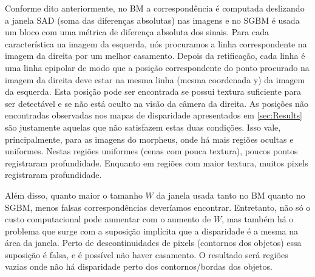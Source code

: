 \documentclass{bmvc2k}
\begin{document}
Conforme dito anteriormente, no BM a correspondência é computada deslizando a janela SAD (soma das diferenças absolutas) nas imagens e no SGBM é usada um bloco com uma métrica de diferença absoluta dos sinais. Para cada característica na imagem da esquerda, nós procuramos a linha correspondente na imagem da direita por um melhor casamento. Depois da retificação, cada linha é uma linha epipolar de modo que a posição correspondente do ponto procurado na imagem da direita deve estar na mesma linha (mesma coordenada y) da imagem da esquerda. Esta posição pode ser encontrada se possui textura suficiente para ser detectável e se não está oculto na visão da câmera da direita. As posições não encontradas observadas nos mapas de disparidade apresentados em \ref{sec:Results} são justamente aquelas que não satisfazem estas duas condições. Isso vale, principalmente, para as imagens do morpheus, onde há mais regiões ocultas e uniformes. Nestas regiões uniformes (cenas com pouca textura), poucos pontos registraram profundidade. Enquanto em regiões com maior textura, muitos pixels registraram profundidade.

Além disso, quanto maior o tamanho $W$ da janela usada tanto no BM quanto no SGBM, menos falsas correspondências deveríamos encontrar. Entretanto, não só o custo computacional pode aumentar com o aumento de $W$, mas também há o problema que surge com a suposição implícita que a disparidade é a mesma na área da janela. Perto de descontinuidades de pixels (contornos dos objetos) essa suposição é falsa, e é possível não haver casamento. O resultado será regiões vazias onde não há disparidade perto dos contornos/bordas dos objetos. 

\end{document}
